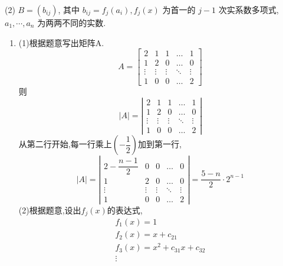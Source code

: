 \documentclass{article}
\begin{document}
(2) $B=\left(b_{i j}\right)$, 其中 $b_{i j}=f_{j}\left(a_{i}\right), f_{j}(x)$ 为首一的 $j-1$ 次实系数多项式,$a_{1}, \cdots, a_{n}$ 为两两不同的实数.
\begin{enumerate}[\qquad 解：]
    \item (1)根据题意写出矩阵A.
          $$
              A=\left[\begin{array}{ccccc}
                      2      & 1      & 1      & \ldots & 1      \\
                      1      & 2      & 0      & \ldots & 0      \\
                      \vdots & \vdots & \vdots & \ddots & \vdots \\
                      1      & 0      & 0      & \ldots & 2
                  \end{array}\right]
          $$
          则
          $$
              |A|=\left|\begin{array}{ccccc}
                  2      & 1      & 1      & \ldots & 1      \\
                  1      & 2      & 0      & \ldots & 0      \\
                  \vdots & \vdots & \vdots & \ddots & \vdots \\
                  1      & 0      & 0      & \ldots & 2
              \end{array}\right|
          $$
          从第二行开始,每一行乘上$\left(-\dfrac{1}{2}\right)$加到第一行,
          $$
              |A|=\left|\begin{array}{ccccc}
                  2-\dfrac{n-1}{2} & 0      & 0      & \ldots & 0      \\
                  1                & 2      & 0      & \ldots & 0      \\
                  \vdots           & \vdots & \vdots & \ddots & \vdots \\
                  1                & 0      & 0      & \ldots & 2
              \end{array}\right|=\dfrac{5-n}{2} \cdot 2^{n-1}
          $$
          (2)根据题意,设出$f_j \left( x \right)$的表达式,
          $$
              \begin{array}{c}
                  f_{1}(x)=1                     \\
                  f_{2}(x)=x+c_{21}              \\
                  f_{3}(x)=x^{2}+c_{31} x+c_{32} \\
                  \vdots                         \\

\end{array}$$
\end{enumerate}
\end{document}
